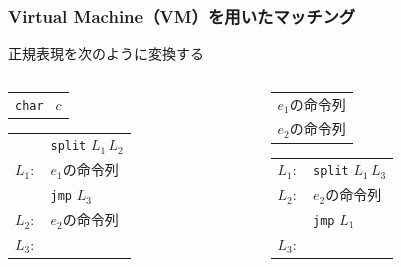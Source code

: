\documentclass[12pt, unicode, svgnames, handout]{beamer}
\begin{document}
\begin{frame}[fragile]
  \frametitle{Virtual Machine（VM）を用いたマッチング}

  正規表現を次のように変換する

  \begin{center}
    \begin{columns}
      \begin{column}{0.4\textwidth}
        \begin{Ldescription}
          \item<2->[文字（$c$）]
            \begin{tabular}{l}
              \texttt{char } $c$ \\
            \end{tabular}

          \item<4->[選択（$e_1 \mid e_2$）]
            \begin{tabular}{cl}
                     & \texttt{split} $L_1\, L_2$  \\
              $L_1:$ & $e_1$の命令列 \\
                     & \texttt{jmp} $L_3$ \\
              $L_2:$ & $e_2$の命令列 \\
              $L_3:$ & \\
            \end{tabular}
        \end{Ldescription}
      \end{column}
      \begin{column}{0.4\textwidth}
        \begin{Ldescription}
          \item<3->[連結（$e_1e_2$）]
            \begin{tabular}{l}
              $e_1$の命令列 \\
              $e_2$の命令列 \\
            \end{tabular}

          \item<5->[繰り返し（$e*$）]
            \begin{tabular}{cl}
              $L_1:$ & \texttt{split} $L_1\, L_3$  \\
              $L_2:$ & $e_2$の命令列 \\
                     & \texttt{jmp} $L_1$ \\
              $L_3:$ & \\
            \end{tabular}
        \end{Ldescription}
      \end{column}
    \end{columns}
  \end{center}
\end{frame}
\end{document}
